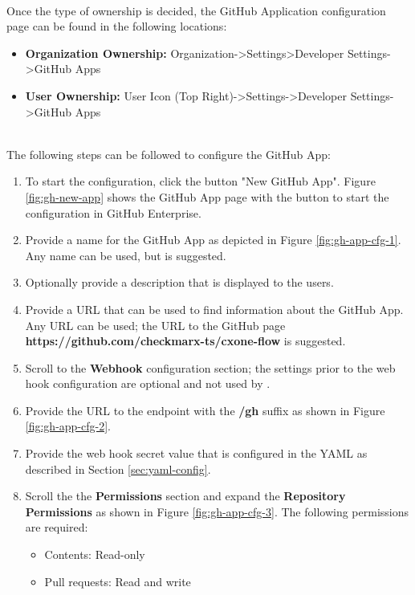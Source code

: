 \noindent\\Once the type of ownership is decided, the GitHub Application configuration page can be found in the following
locations:

\begin{itemize}
    \item \textbf{Organization Ownership:} Organization->Settings>Developer Settings->GitHub Apps
    \item \textbf{User Ownership:} User Icon (Top Right)->Settings->Developer Settings->GitHub Apps
\end{itemize}

\noindent\\The following steps can be followed to configure the \cxoneflow GitHub App:

\begin{enumerate}
    \item To start the configuration, click the button "New GitHub App". Figure \ref{fig:gh-new-app} shows
    the GitHub App page with the button to start the configuration in GitHub Enterprise.
    \item Provide a name for the GitHub App as depicted in Figure \ref{fig:gh-app-cfg-1}.  Any name
    can be used, but \cxoneflow is suggested.
    \item Optionally provide a description that is displayed to the users.
    \item Provide a URL that can be used to find information about the \cxoneflow GitHub App.  Any URL
    can be used; the URL to the \cxoneflow GitHub page \textbf{https://github.com/checkmarx-ts/cxone-flow}
    is suggested.
    \item Scroll to the \textbf{Webhook} configuration section; the settings prior to the web hook configuration
    are optional and not used by \cxoneflow.
    \item Provide the URL to the \cxoneflow endpoint with the \textbf{/gh} suffix as shown in Figure \ref{fig:gh-app-cfg-2}.
    \item Provide the web hook secret value that is configured in the \cxoneflow YAML as described in Section \ref{sec:yaml-config}.
    \item Scroll the the \textbf{Permissions} section and expand the \textbf{Repository Permissions} as shown in
    Figure \ref{fig:gh-app-cfg-3}.  The following permissions are required:
    \begin{itemize}
        \item Contents: Read-only
        \item Pull requests: Read and write

\end{itemize}
\end{enumerate}
